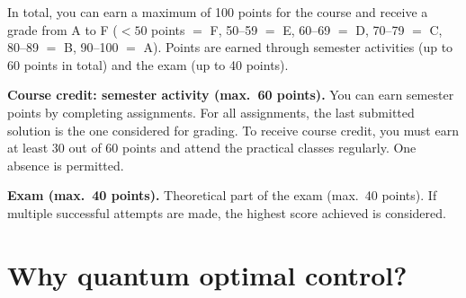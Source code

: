 \documentclass[handoutsbeamer.tex]{subfiles}
\begin{document}
\begin{frame}
In total, you can earn a maximum of 100 points for the course and receive a grade from A to F ($<50$ points $=$ F, 50--59 $=$ E, 60--69 $=$ D, 70--79 $=$ C, 80--89 $=$ B, 90--100 $=$ A).
Points are earned through semester activities (up to 60 points in total) and the exam (up to 40 points).

\textbf{Course credit: semester activity (max.\ 60 points).}
You can earn semester points by completing assignments.
For all assignments, the last submitted solution is the one considered for grading.
To receive course credit, you must earn at least 30 out of 60 points and attend the practical classes regularly. One absence is permitted.

\textbf{Exam (max.\ 40 points).}
Theoretical part of the exam (max.\ 40 points). If multiple successful attempts are made, the highest score achieved is considered.
\end{frame}

\section{Why quantum optimal control?}
\end{document}
